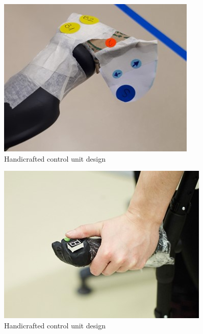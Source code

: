 \begin{figure}
    \centering
    \includegraphics{Appendix/User-centered_design_method/WS_Karton.jpg}
    \caption{Handicrafted control unit design}
    \label{fig:handicraft}
\end{figure}
\begin{figure}
    \centering
    \includegraphics{Appendix/User-centered_design_method/WS_Fimo.jpg}
    \caption{Handicrafted control unit design}
    \label{fig:handicraftfimo}
\end{figure}
